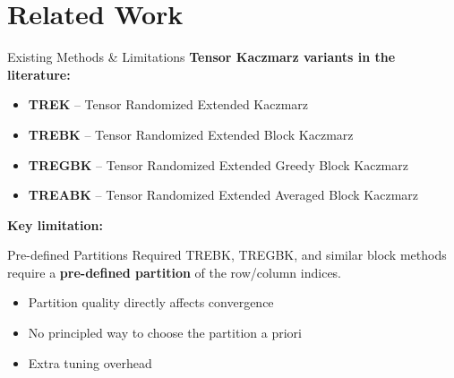 \documentclass[aspectratio=169]{beamer}
\begin{document}
\section{Related Work}
\begin{frame}{Existing Methods \& Limitations}
  \textbf{Tensor Kaczmarz variants in the literature:}
  \begin{itemize}
    \item \textbf{TREK} -- Tensor Randomized Extended Kaczmarz \cite{huang2024tensor}
    \item \textbf{TREBK} -- Tensor Randomized Extended Block Kaczmarz \cite{huang2024tensor}
    \item \textbf{TREGBK} -- Tensor Randomized Extended Greedy Block Kaczmarz \cite{huang2024tensor}
    \item \textbf{TREABK} -- Tensor Randomized Extended Averaged Block Kaczmarz \cite{an2025randomized,bao2022randomized}
  \end{itemize}
\end{frame}

\begin{frame}
  \textbf{Key limitation:}
  \begin{alertblock}{Pre-defined Partitions Required}
    TREBK, TREGBK, and similar block methods require a
    \textbf{pre-defined partition} of the row/column indices.
    \begin{itemize}
      \item Partition quality directly affects convergence
      \item No principled way to choose the partition a priori
      \item Extra tuning overhead
    \end{itemize}
  \end{alertblock}
\end{frame}

\end{document}
